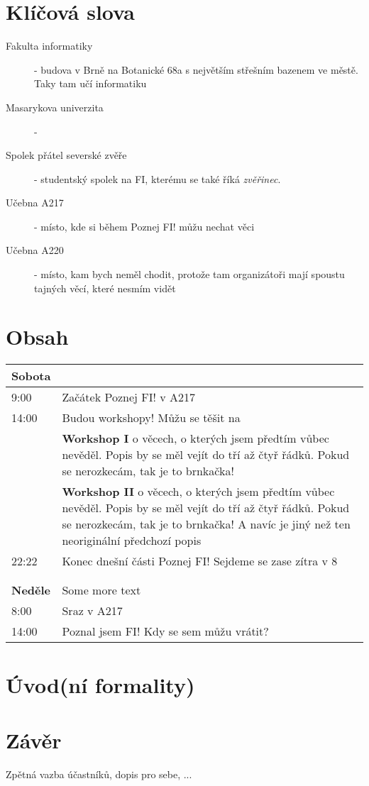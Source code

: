 \documentclass[]{article}
\begin{document}
\section{Klíčová slova}

\begin{description}
    \item[Fakulta informatiky] - budova v Brně na Botanické 68a s největším střešním bazenem ve městě. Taky tam učí informatiku
    \item[Masarykova univerzita] - 
    \item[Spolek přátel severské zvěře] - studentský spolek na FI, kterému se také říká \textit{zvěřinec}.
    \item[Učebna A217] - místo, kde si během Poznej FI! můžu nechat věci
    \item[Učebna A220] - místo, kam bych neměl chodit, protože tam organizátoři mají spoustu tajných věcí, které nesmím vidět
\end{description}
     

\section{Obsah}

    \begin{tabularx}{\textwidth}{lX}
        \textbf{Sobota} &  \\ \hline
        9:00 & Začátek Poznej FI! v A217 \\
        14:00 & Budou workshopy! Můžu se těšit na \\
        & \textbf{Workshop I} o věcech, o kterých jsem předtím vůbec nevěděl. Popis by se měl vejít do tří až čtyř řádků. Pokud se nerozkecám, tak je to brnkačka! \\
        & \textbf{Workshop II} o věcech, o kterých jsem předtím vůbec nevěděl. Popis by se měl vejít do tří až čtyř řádků. Pokud se nerozkecám, tak je to brnkačka! A navíc je jiný než ten neoriginální předchozí popis \\
        22:22 & Konec dnešní části Poznej FI! Sejdeme se zase zítra v 8 \\
        & \\ 
        & \\ 
        \textbf{Neděle} & Some more text \\ \hline
        8:00 & Sraz v A217 \\
        14:00 & Poznal jsem FI! Kdy se sem můžu vrátit? \\
    \end{tabularx}

\section{Úvod(ní formality)}



\appendix
\section{Závěr}

Zpětná vazba účastníků, dopis pro sebe, ...
\end{document}
